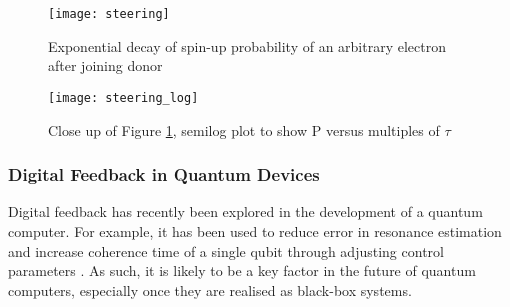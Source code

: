 	\begin{figure}[htbp!]
		\centering
		\texttt{[image: steering]}
		\caption{Exponential decay of spin-up probability of an arbitrary electron after joining donor}
		\label{fig::spin_steering}
	\end{figure}
	
	
	\begin{figure}[htbp!]
		\centering
		\texttt{[image: steering\_log]}
		\caption{Close up of Figure \ref{fig::spin_steering}, semilog plot to show P versus multiples of $\tau$}
		\label{fig::spin_steering_log}
	\end{figure}


\subsubsection{Digital Feedback in Quantum Devices}

Digital feedback has recently been explored in the development of a quantum computer. For example, it has been used to reduce error in resonance estimation \cite{bonato2015optimized} and increase coherence time of a single qubit through adjusting control parameters \cite{shulman2014suppressing}. As such, it is likely to be a key factor in the future of quantum computers, especially once they are realised as black-box systems.
